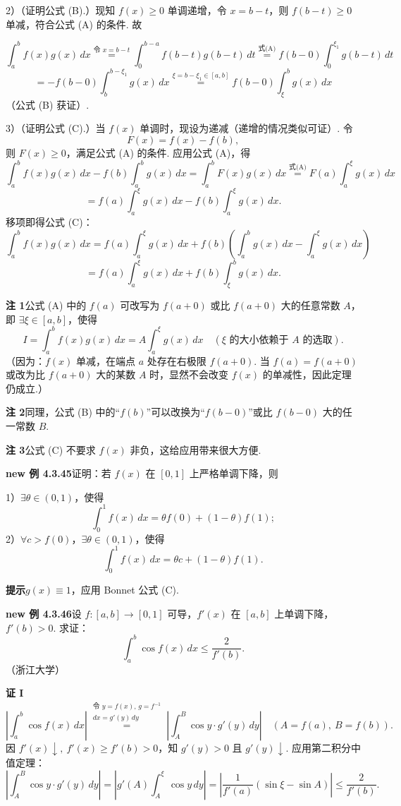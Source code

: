 \documentclass[UTF8,12pt,a4paper,fontset=fandol]{ctexart}
\begin{document}
2）（证明公式 (B).）现知 $f(x)\ge0$ 单调递增，令 $x=b-t$，则 $f(b-t)\ge0$ 单减，符合公式 (A) 的条件. 故

\[
\int_a^b f(x)g(x)\,dx\stackrel{\text{令 }x=b-t}{=}
\int_0^{b-a}f(b-t)g(b-t)\,dt
\stackrel{\text{式(A)}}{=}f(b-0)\int_0^{\xi_1}g(b-t)\,dt
\]
\[
=-f(b-0)\int_b^{b-\xi_1}g(x)\,dx
\stackrel{\xi=b-\xi_1\in[a,b]}{=}f(b-0)\int_\xi^b g(x)\,dx
\]
（公式 (B) 获证）.

3）（证明公式 (C).）当 $f(x)$ 单调时，现设为递减（递增的情况类似可证）. 令
\[
F(x)=f(x)-f(b),
\]
则 $F(x)\ge0$，满足公式 (A) 的条件. 应用公式 (A)，得
\[
\int_a^b f(x)g(x)\,dx-f(b)\int_a^b g(x)\,dx
=\int_a^b F(x)g(x)\,dx
\stackrel{\text{式(A)}}{=}F(a)\int_a^\xi g(x)\,dx
\]
\[
=f(a)\int_a^\xi g(x)\,dx-f(b)\int_a^\xi g(x)\,dx.
\]
移项即得公式 (C)：
\[
\int_a^b f(x)g(x)\,dx
=f(a)\int_a^\xi g(x)\,dx
+f(b)\left(\int_a^b g(x)\,dx-\int_a^\xi g(x)\,dx\right)
\]
\[
=f(a)\int_a^\xi g(x)\,dx+f(b)\int_\xi^b g(x)\,dx.
\]

\noindent\textbf{注 1}\quad 公式 (A) 中的 $f(a)$ 可改写为 $f(a+0)$ 或比 $f(a+0)$ 大的任意常数 $A$，即 $\exists\xi\in[a,b]$，使得
\[
I=\int_a^b f(x)g(x)\,dx=A\int_a^\xi g(x)\,dx
\quad(\xi\text{ 的大小依赖于 }A\text{ 的选取}).
\tag{A'}
\]
（因为：$f(x)$ 单减，在端点 $a$ 处存在右极限 $f(a+0)$. 当 $f(a)=f(a+0)$ 或改为比 $f(a+0)$ 大的某数 $A$ 时，显然不会改变 $f(x)$ 的单减性，因此定理仍成立.）

\noindent\textbf{注 2}\quad 同理，公式 (B) 中的“$f(b)$”可以改换为“$f(b-0)$”或比 $f(b-0)$ 大的任一常数 $B$.

\noindent\textbf{注 3}\quad 公式 (C) 不要求 $f(x)$ 非负，这给应用带来很大方便.

\noindent\textbf{new 例 4.3.45}\quad 证明：若 $f(x)$ 在 $[0,1]$ 上严格单调下降，则

1）$\exists\theta\in(0,1)$，使得
\[
\int_0^1 f(x)\,dx=\theta f(0)+(1-\theta)f(1);
\]
2）$\forall c>f(0)$，$\exists\theta\in(0,1)$，使得
\[
\int_0^1 f(x)\,dx=\theta c+(1-\theta)f(1).
\]

\noindent\textbf{提示}\quad $g(x)\equiv1$，应用 Bonnet 公式 (C).

\noindent\textbf{new 例 4.3.46}\quad 设 $f:[a,b]\to[0,1]$ 可导，$f'(x)$ 在 $[a,b]$ 上单调下降，$f'(b)>0$. 求证：
\[
\int_a^b \cos f(x)\,dx\le\frac2{f'(b)}.
\]
（浙江大学）

\noindent\textbf{证 I}\quad
\[
\left|\int_a^b\cos f(x)\,dx\right|
\stackrel{\substack{\text{令 }y=f(x),\,g=f^{-1}\\ dx=g'(y)\,dy}}{=}
\left|\int_A^B\cos y\cdot g'(y)\,dy\right|
\quad(A=f(a),\ B=f(b)).
\tag{1}
\]
因 $f'(x)\downarrow,\ f'(x)\ge f'(b)>0$，知 $g'(y)>0$ 且 $g'(y)\downarrow$. 应用第二积分中值定理：
\[
\left|\int_A^B\cos y\cdot g'(y)\,dy\right|
=\left|g'(A)\int_A^\xi\cos y\,dy\right|
=\left|\frac1{f'(a)}(\sin\xi-\sin A)\right|
\le\frac2{f'(b)}.
\]
\end{document}
